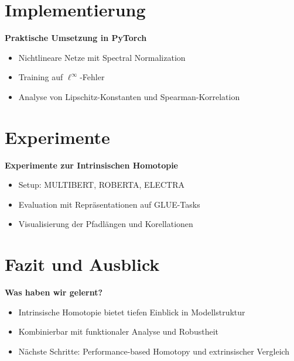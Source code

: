 \section{Implementierung}
\begin{frame}
	\textbf{Praktische Umsetzung in PyTorch}\\
	\begin{itemize}
		\item Nichtlineare Netze mit Spectral Normalization
		\item Training auf $\ell^\infty$-Fehler
		\item Analyse von Lipschitz-Konstanten und Spearman-Korrelation
	\end{itemize}
\end{frame}

\section{Experimente}
\begin{frame}
	\textbf{Experimente zur Intrinsischen Homotopie}\\
	\begin{itemize}
		\item Setup: MULTIBERT, ROBERTA, ELECTRA
		\item Evaluation mit Repräsentationen auf GLUE-Tasks
		\item Visualisierung der Pfadlängen und Korellationen
	\end{itemize}
\end{frame}

\section{Fazit und Ausblick}
\begin{frame}
	\textbf{Was haben wir gelernt?}\\
	\begin{itemize}
		\item Intrinsische Homotopie bietet tiefen Einblick in Modellstruktur
		\item Kombinierbar mit funktionaler Analyse und Robustheit
		\item Nächste Schritte: Performance-based Homotopy und extrinsischer Vergleich	\end{itemize}
\end{frame}
